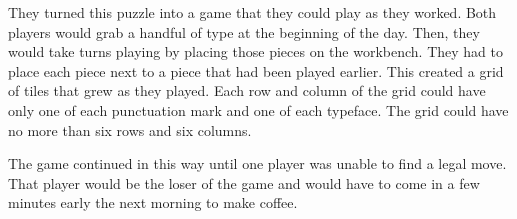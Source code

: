 \documentclass[a4paper, DIV=15]{scrartcl}
\begin{document}
\begin{pullquote}
They turned this puzzle into a game that they could play as they worked. Both players would grab a handful of type at the beginning of the day. Then, they would take turns playing by placing those pieces on the workbench. They had to place each piece next to a piece that had been played earlier. This created a grid of tiles that grew as they played. Each row and column of the grid could have only one of each punctuation mark and one of each typeface. The grid could have no more than six rows and six columns.

The game continued in this way until one player was unable to find a legal move. That player would be the loser of the game and would have to come in a few minutes early the next morning to make coffee.
\end{pullquote}
\end{document}
